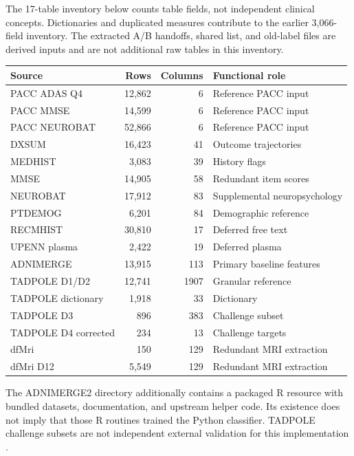 \documentclass[11pt,a4paper]{article}
\begin{document}
The 17-table inventory below counts table fields, not independent clinical concepts. Dictionaries and duplicated measures contribute to the earlier 3,066-field inventory. The extracted A/B handoffs, shared list, and old-label files are derived inputs and are not additional raw tables in this inventory.
\begin{center}\small
\begin{tabular}{p{.25\linewidth}rrp{.36\linewidth}}\hline
Source & Rows & Columns & Functional role\\\hline
PACC ADAS Q4 & 12,862 & 6 & Reference PACC input\\
PACC MMSE & 14,599 & 6 & Reference PACC input\\
PACC NEUROBAT & 52,866 & 6 & Reference PACC input\\
DXSUM & 16,423 & 41 & Outcome trajectories\\
MEDHIST & 3,083 & 39 & History flags\\
MMSE & 14,905 & 58 & Redundant item scores\\
NEUROBAT & 17,912 & 83 & Supplemental neuropsychology\\
PTDEMOG & 6,201 & 84 & Demographic reference\\
RECMHIST & 30,810 & 17 & Deferred free text\\
UPENN plasma & 2,422 & 19 & Deferred plasma\\
ADNIMERGE & 13,915 & 113 & Primary baseline features\\
TADPOLE D1/D2 & 12,741 & 1907 & Granular reference\\
TADPOLE dictionary & 1,918 & 33 & Dictionary\\
TADPOLE D3 & 896 & 383 & Challenge subset\\
TADPOLE D4 corrected & 234 & 13 & Challenge targets\\
dfMri & 150 & 129 & Redundant MRI extraction\\
dfMri D12 & 5,549 & 129 & Redundant MRI extraction\\
\hline\end{tabular}\end{center}
The ADNIMERGE2 directory additionally contains a packaged R resource with bundled datasets, documentation, and upstream helper code. Its existence does not imply that those R routines trained the Python classifier. TADPOLE challenge subsets are not independent external validation for this implementation \cite{tadpole}.

\clearpage
\end{document}
